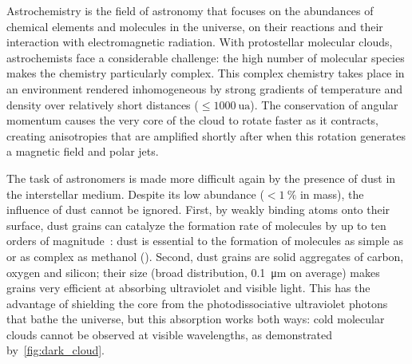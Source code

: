 Astrochemistry is the field of astronomy that focuses on the abundances of chemical elements and molecules in the universe, on their reactions and their interaction with electromagnetic radiation.
With protostellar molecular clouds, astrochemists face a considerable challenge:
the high number of molecular species makes the chemistry particularly complex.
This complex chemistry takes place in an environment rendered inhomogeneous by strong gradients of temperature and density over relatively short distances ($\le \SI{1000}{\astronomicalunit}$).
The conservation of angular momentum causes the very core of the cloud to rotate faster as it contracts, creating anisotropies that are amplified shortly after when this rotation generates a magnetic field and polar jets.

The task of astronomers is made more difficult again by the presence of dust in the interstellar medium.
Despite its low abundance ($< \SI{1}{\percent}$ in mass), the influence of dust cannot be ignored.
First, by weakly binding atoms onto their surface,
dust grains can catalyze the formation rate of molecules by up to ten orders of magnitude~\autocite{dulieu2013micron}:
dust is essential to the formation of molecules as simple as~ or as complex as methanol ().
Second, dust grains are solid aggregates of carbon, oxygen and silicon;
their size (broad distribution, \SI{0.1}{\micro\meter} on average) makes grains very efficient at absorbing ultraviolet and visible light.
This has the advantage of shielding the core from the photodissociative ultraviolet photons that bathe the universe, but this absorption works both ways:
cold molecular clouds cannot be observed at visible wavelengths, as demonstrated by~\cref{fig:dark_cloud}.

